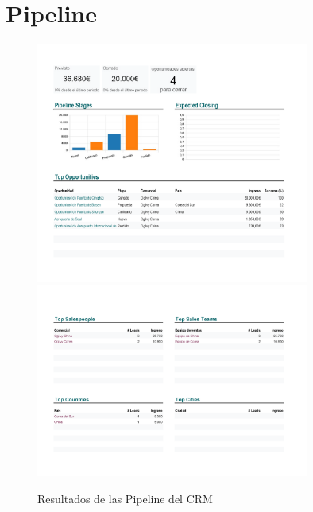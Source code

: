 \documentclass{report}
\begin{document}
        \section*{Pipeline}
            \begin{figure}[H]
                \centering
                \includegraphics[width=0.8\textwidth]{./img/Pipeline1.png}
                \includegraphics[width=0.8\textwidth]{./img/Pipeline2.png}
                \caption{Resultados de las Pipeline del CRM}
            \end{figure}
\end{document}
